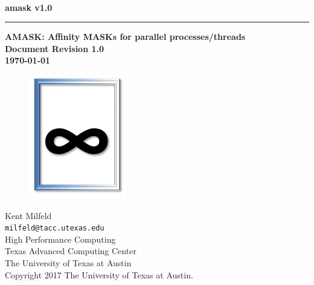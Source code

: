 \documentclass[10pt,a4paper]{report}
\begin{document}
\begin{titlepage}
\thispagestyle{empty}	%
\verb+ +
\vspace{1em}
\begin{flushright}
\huge\bf amask v1.0\\
\rule{\textwidth}{4pt}
\large{\bf AMASK: Affinity MASKs for parallel processes/threads\\
Document Revision 1.0\\
\today}
\end{flushright}
\vfill
\begin{figure}[ht!]
       \centering
        \includegraphics[width=0.5\columnwidth]{images/logo_mask.png}
\end{figure}

\vfill
\begin{flushleft}
Kent Milfeld \\
\verb+milfeld@tacc.utexas.edu+\\
\vspace{0.5em}
High Performance Computing \\
Texas Advanced Computing Center\\
The University of Texas at Austin\\
\vspace{0.5em}
Copyright 2017 The University of Texas at Austin.
\end{flushleft}
\end{titlepage}
\end{document}
